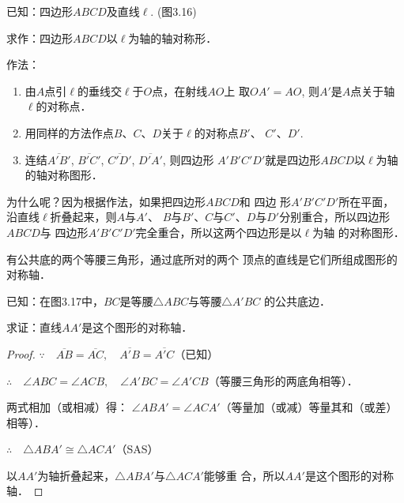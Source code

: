 \begin{example}
已知：四边形$ABCD$及直线$\ell$. (图3.16)

求作：四边形$ABCD$以$\ell$为轴的轴对称形．

作法：
\begin{enumerate}
\item 由$A$点引$\ell$的垂线交$\ell$于$O$点，在射线$AO$上
取$OA'=AO$, 则$A'$是$A$点关于轴$\ell$的对称点．
\item 用同样的方法作点$B$、$C$、$D$关于$\ell$的对称点$B'$、
$C'$、$D'$.
\item 连结$\overline{A'B'}$, $\overline{B'C'}$, $\overline{C'D'}$, $\overline{D'A'}$, 则四边形
$A'B'C'D'$就是四边形$ABCD$以$\ell$为轴的轴对称图形．
\end{enumerate}

为什么呢？因为根据作法，如果把四边形$ABCD$和 四边
形$A'B'C'D'$所在平面，沿直线$\ell$折叠起来，则$A$与$A'$、
$B$与$B'$、$C$与$C'$、$D$与$D'$分别重合，所以四边形$ABCD$与
四边形$A'B'C'D'$完全重合，所以这两个四边形是以$\ell$为轴
的对称图形．
\end{example}

\begin{example}
    有公共底的两个等腰三角形，通过底所对的两个
顶点的直线是它们所组成图形的对称轴．

已知：在图3.17中，$BC$是等腰$\triangle ABC$与等腰$\triangle A'BC$
的公共底边．

求证：直线$AA'$是这个图形的对称轴．
\end{example}

\begin{figure}[htp]
    \centering
{}
    \caption{}
\end{figure}

\begin{proof}
$\because\quad \overline{AB}=\overline{AC},\quad \overline{A'B}=\overline{A'C}$（已知）

$\therefore\quad \angle ABC=\angle ACB,\quad 
\angle A'BC=\angle A'CB$（等腰三角形的两底角相等）．

两式相加（或相减）得：
$\angle ABA'=\angle ACA'$（等量加（或减）等量其和（或差）
相等）．

$\therefore\quad \triangle ABA'\cong \triangle ACA'$（SAS）

以$AA'$为轴折叠起来，$\triangle ABA'$与$\triangle ACA'$能够重
合，所以$AA'$是这个图形的对称轴．
\end{proof}

